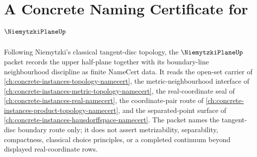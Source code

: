 \chapter{A Concrete Naming Certificate for $\NiemytzkiPlaneUp$}
\label{ch:concrete-instances-niemytzki-plane-namecert}

Following Niemytzki's classical tangent-disc topology, the $\NiemytzkiPlaneUp$ packet records the upper half-plane together with its boundary-line neighbourhood discipline as finite NameCert data. It reads the open-set carrier of \autoref{ch:concrete-instances-topology-namecert}, the metric-neighbourhood interface of \autoref{ch:concrete-instances-metric-topology-namecert}, the real-coordinate seal of \autoref{ch:concrete-instances-real-namecert}, the coordinate-pair route of \autoref{ch:concrete-instances-product-topology-namecert}, and the separated-point surface of \autoref{ch:concrete-instances-hausdorffspace-namecert}. The packet names the tangent-disc boundary route only; it does not assert metrizability, separability, compactness, classical choice principles, or a completed continuum beyond displayed real-coordinate rows.

